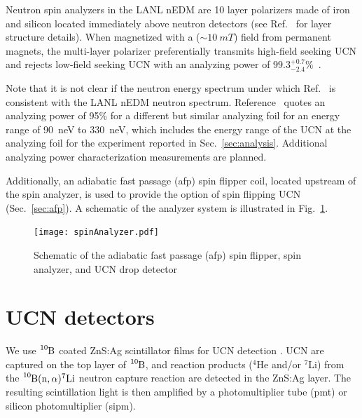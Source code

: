 
Neutron spin analyzers in the LANL nEDM are 10 layer polarizers made of iron and silicon located immediately above neutron detectors (see Ref.~\cite{ThorstenThesis} for layer structure details). When magnetized with a ($\sim \qty{10}{mT}$) field from permanent magnets, the multi-layer polarizer preferentially transmits high-field seeking UCN and rejects low-field seeking UCN with an analyzing power of $99.3^{+0.7}_{-2.4}\%$~\cite{ThorstenThesis}.

Note that it is not clear if the neutron energy spectrum under which Ref.~\cite{ThorstenThesis} is consistent with the LANL nEDM neutron spectrum. Reference~\cite{afach_device_2015} quotes an analyzing power of 95\% for a different but similar analyzing foil for an energy range of 90~neV to 330~neV, which includes the energy range of the UCN at the analyzing foil for the experiment reported in Sec.~\ref{sec:analysis}. Additional analyzing power characterization measurements are planned.

Additionally, an adiabatic fast passage (\acrshort{afp}) spin flipper coil, located upstream of the spin analyzer, is used to provide the option of spin flipping UCN (Sec.~\ref{sec:afp}). A schematic of the analyzer system is illustrated in Fig.~\ref{fig:SpinAnalyzer}.

\begin{figure}
    \centering
    \texttt{[image: spinAnalyzer.pdf]}
    \caption{Schematic of the adiabatic fast passage (\acrshort{afp}) spin flipper, spin analyzer, and UCN drop detector}
    \label{fig:SpinAnalyzer}
\end{figure}


\section{UCN detectors}\label{sec:ucn_detectors}


We use $\ce{^{10}B}$ coated ZnS:Ag scintillator films for UCN detection \cite{jeph_b10_2011}. UCN are captured on the top layer of $\ce{^{10}B}$, and reaction products ($^4$He and/or $^7$Li) from the $\ce{^{10}B}(\text{n},\alpha)^7\text{Li}$ neutron capture reaction are detected in the ZnS:Ag layer. The resulting scintillation light is then amplified by a photomultiplier tube (\acrshort*{pmt}) or silicon photomultiplier (\acrshort*{sipm}).

